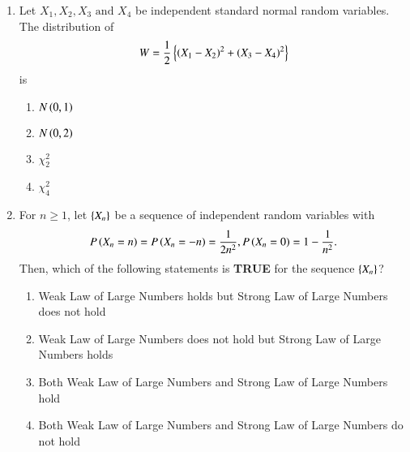 \documentclass[journal,12pt,onecolumn]{IEEEtran}
\theoremstyle{remark}
\begin{document}
\begin{enumerate}
\item Let $X_1,X_2,X_3 \text{ and } X_4$ be independent standard normal random variables. The distribution of
\begin{align*}
W = \frac{1}{2}\left\{\left(X_1-X_2\right)^2 + \left(X_3-X_4\right)^2\right\}
\end{align*} is
\hfill{}
\begin{enumerate}
\item $N\left(0,1\right)$
\item $N\left(0,2\right)$
\item $\chi_{2}^{2}$
\item $\chi_{4}^{2}$
\end{enumerate}

\item For $n\geq 1$, let $\left\{X_n\right\}$ be a sequence of independent random variables with
\begin{align*}
	P\left(X_n = n\right) = P\left(X_n = -n\right) = \frac{1}{2n^2}, P\left(X_n = 0\right) = 1 - \frac{1}{n^2}.
\end{align*}
Then, which of the following statements is \textbf{TRUE} for the sequence $\left\{X_n\right\}$?
\hfill{}
\begin{enumerate}
\item Weak Law of Large Numbers holds but Strong Law of Large Numbers does not hold
\item Weak Law of Large Numbers does not hold but Strong Law of Large Numbers holds
\item Both Weak Law of Large Numbers and Strong Law of Large Numbers hold
\item Both Weak Law of Large Numbers and Strong Law of Large Numbers do not hold
\end{enumerate}

\end{enumerate}
\end{document}
